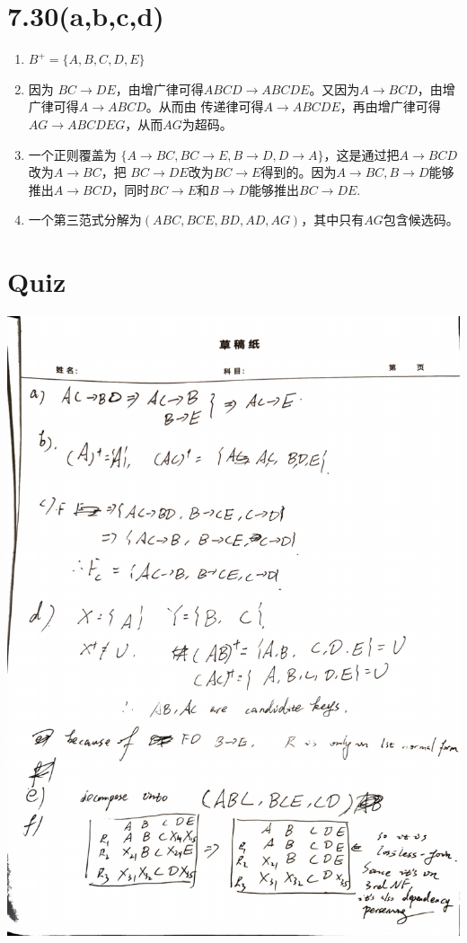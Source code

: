 \documentclass[a4paper]{article}
\begin{document}
\section{7.30(a,b,c,d)}
\begin{enumerate}
    \item $B^+=\{A,B,C,D,E\}$
    \item 因为 $BC\rightarrow DE$，由增广律可得$ABCD\rightarrow ABCDE$。又因为$A\rightarrow BCD$，由增广律可得$A\rightarrow ABCD$。从而由
    传递律可得$A\rightarrow ABCDE$，再由增广律可得$AG\rightarrow ABCDEG$，从而$AG$为超码。
    \item 一个正则覆盖为 $\{A\rightarrow BC,BC\rightarrow E,B\rightarrow D,D\rightarrow A\}$，这是通过把$A\rightarrow BCD$改为$A\rightarrow BC$，把 
    $BC\rightarrow DE$改为$BC\rightarrow E$得到的。因为$A\rightarrow BC,B\rightarrow D$能够推出$A\rightarrow BCD$，同时$BC\rightarrow E$和$B\rightarrow D$能够推出$BC\rightarrow DE$.
    \item 一个第三范式分解为$(ABC,BCE,BD,AD,AG)$，其中只有$AG$包含候选码。
\end{enumerate}
\section{Quiz}
\includegraphics[width=\textwidth]{quiz.pdf}
\end{document}
